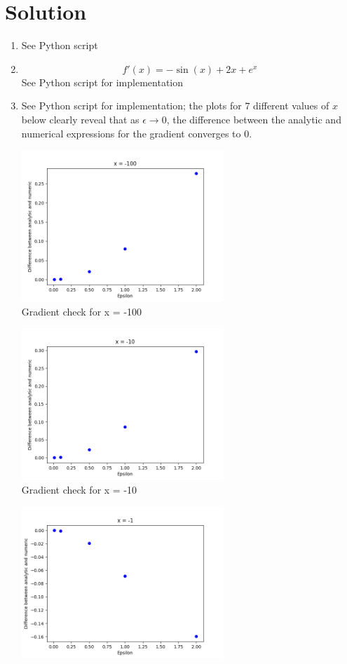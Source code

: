 \documentclass[submit]{harvardml}
\begin{document}
\section*{Solution}

\begin{enumerate}
    \item See Python script
    \item \[f'(x) = -\sin(x) + 2x + e^x\] See Python script for implementation
    \item See Python script for implementation; the plots for $7$ different values of $x$ below clearly reveal that as $\epsilon \rightarrow 0$, the difference between the analytic and numerical expressions for the gradient converges to $0$.
    
    \begin{center}
        \includegraphics[width=0.6\textwidth]{x-100}\\
        Gradient check for x = -100
    \end{center}
    \begin{center}
        \includegraphics[width=0.6\textwidth]{x-10}\\
        Gradient check for x = -10
    \end{center}
    \begin{center}
        \includegraphics[width=0.6\textwidth]{x-1}\\

\end{center}
\end{enumerate}
\end{document}
